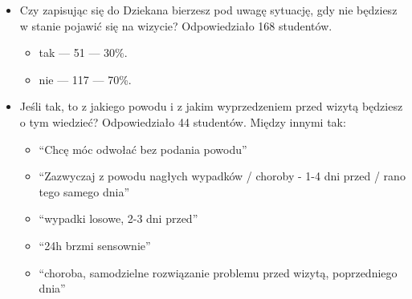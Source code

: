 \documentclass[licencjacka]{pracamgr}
\begin{document}
\begin{itemize}
\item Czy zapisując się do Dziekana bierzesz pod uwagę sytuację, gdy nie będziesz w stanie pojawić się na wizycie?
Odpowiedziało 168 studentów.
\begin{itemize}
\setlength\itemsep{0,05em}

\item tak --- 51 --- 30\%.
\item nie --- 117 --- 70\%.
\end{itemize}

\item Jeśli tak, to z jakiego powodu i z jakim wyprzedzeniem przed wizytą będziesz o tym wiedzieć?
Odpowiedziało 44 studentów. Między innymi tak:
\begin{itemize}
\setlength\itemsep{0,05em}
\item \enquote{Chcę móc odwołać bez podania powodu}
\item \enquote{Zazwyczaj z powodu nagłych wypadków / choroby - 1-4 dni przed / rano tego samego dnia}
\item \enquote{wypadki losowe, 2-3 dni przed}
\item \enquote{24h brzmi sensownie}
\item \enquote{choroba, samodzielne rozwiązanie problemu przed wizytą, poprzedniego dnia}
\end{itemize}


\end{itemize}
\end{document}
